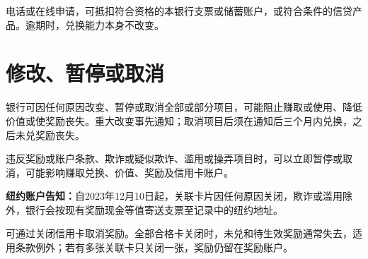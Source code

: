 \documentclass[UTF8,fontset=none,11pt,a4paper]{ctexart}
\begin{document}
电话或在线申请，可抵扣符合资格的本银行支票或储蓄账户，或符合条件的信贷产品。逾期时，兑换能力本\allowbreak\mbox{身不改变。}


\section*{修改、暂停或取消}
银行可因任何原因改变、暂停或取消全部或部分项目，可能阻止赚取或使用、降低价值或使奖励丧失。重大改变事先通知；取消项目后须在通知后三个月内兑换，之后未兑\allowbreak\mbox{奖励丧失。}


违反奖励或账户条款、欺诈或疑似欺诈、滥用或操弄项目时，可以立即暂停或取消，可能影响赚取兑换、价值、奖励及信\allowbreak\mbox{用卡账户。}


\textbf{纽约账户告知：}自2023年12月10日起，关联卡片因任何原因关闭，欺诈或滥用除外，银行会按现有奖励现金等值寄送支票至记录中的\allowbreak\mbox{纽约地址。}


可通过关闭信用卡取消奖励。全部合格卡关闭时，未兑和待生效奖励通常失去，适用条款例外；若有多张关联卡只关闭一张，奖励仍留在\allowbreak\mbox{奖励账户。}
\end{document}
